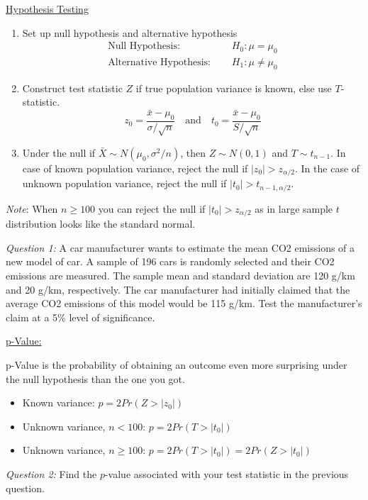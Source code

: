 \documentclass{./../../Latex/handout}
\begin{document}
\thispagestyle{plain}

\vspace{-0.5em}
\underline{Hypothesis Testing} \vspace{-0.5em}
\begin{enumerate}
  \item Set up null hypothesis and  alternative hypothesis  
 \begin{align*}
  	\text{Null Hypothesis: } \quad & H_0: \mu = \mu_0 \\
  	\text{Alternative Hypothesis: } \quad & H_1: \mu \neq \mu_0
  \end{align*}

  \item Construct test statistic $Z$ if true population variance is known, else use $T$-statistic.  
 $$ z_0 = \frac{\bar{x}-\mu_0}{\sigma/\sqrt{n}} \quad \text{and} \quad t_0 = \frac{\bar{x}-\mu_0}{S/\sqrt{n}}  $$
 \item Under the null if $\bar{X} \sim N(\mu_0, \sigma^2/n)$, then $Z \sim N(0,1)$ and $T \sim t_{n-1}$. 
In case of known population variance, reject the null if $|z_0|>z_{\alpha/2}$. In the case of unknown population variance, reject the null if $|t_0|>t_{n-1,\alpha/2}$.
\end{enumerate}
\vspace{-0.5em}
\textit{Note}: When $n \geq 100$ you can reject the null if $|t_0|>z_{\alpha/2}$ as in large sample $t$ distribution looks like the standard normal. 

\textit{Question 1:} A car manufacturer wants to estimate the mean CO2 emissions of a new model of car. A sample of 196 cars is randomly selected and their CO2 emissions are measured. The sample mean and standard deviation are 120 g/km and 20 g/km, respectively. The car manufacturer had initially claimed that the average CO2 emissions of this model would be 115 g/km. Test the manufacturer's claim at a 5\% level of significance.

\newpage
\underline{p-Value:} 

p-Value is the probability of obtaining an outcome even more surprising under the null hypothesis than the one you got. \vspace{-0.5em}
\begin{itemize}
  \item Known variance: $ p = 2Pr(Z>|z_0|)$ 
\item Unknown variance, $n<100$: $p=2Pr(T>|t_0|)$ 
\item Unknown variance, $n \geq 100$:  $p=2Pr(T>|t_0|)=2Pr(Z>|t_0|)$ 
\end{itemize}

\textit{Question 2:} Find the $p$-value associated with your test statistic in the previous question.
\end{document}

